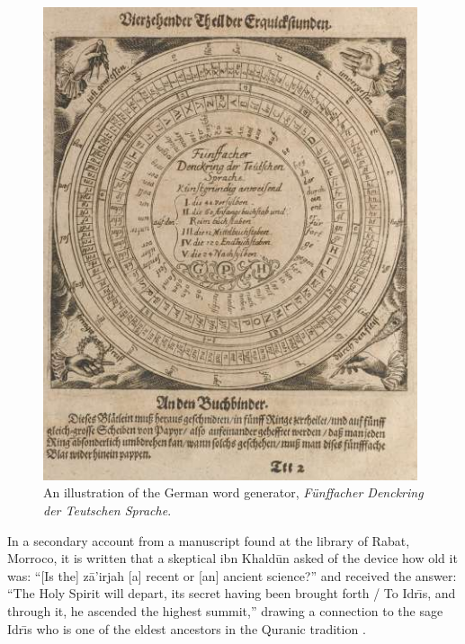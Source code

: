 \begin{figure}
    \centering
    \includegraphics[width=0.98\textwidth]{ch1/images/baroqe.png}

    \caption{An illustration of the German word generator, \textit{F{\"u}nffacher Denckring der Teutschen Sprache}.}
    \label{fig:denckring}
\end{figure}



In a secondary account from a manuscript found at the library of Rabat, 
Morroco, it is written that a skeptical ibn Khald\={u}n asked of the device
how old it was: 
``[Is the] z\={a}'irjah [a] recent or [an] ancient science?'' 
and received the answer: ``The  Holy  Spirit  will  depart,  
its  secret  having
been brought forth / To Idr\={\i}s, and through it, 
he ascended the highest summit,'' drawing a connection to the sage
Idr\={\i}s who is one of the eldest
ancestors in the Quranic tradition \citep{rosenthal1958muqaddimah,link2010variantology}.



